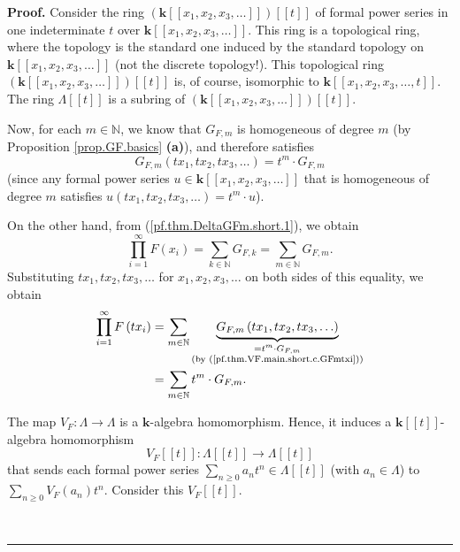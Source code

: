 \documentclass[numbers=enddot,12pt,final,onecolumn,notitlepage]{scrartcl}%
\theoremstyle{definition}
\newenvironment{proof}[1][Proof]{\noindent\textbf{#1.} }{\ \rule{0.5em}{0.5em}}
\let\sumnonlimits\sum
\let\prodnonlimits\prod
\renewcommand{\sum}{\sumnonlimits\limits}
\renewcommand{\prod}{\prodnonlimits\limits}
\newenvironment{vershort}{}{}
\begin{document}
\begin{vershort}
\begin{proof}
Consider the ring $\left(  \mathbf{k}\left[  \left[  x_{1},x_{2},x_{3}%
,\ldots\right]  \right]  \right)  \left[  \left[  t\right]  \right]  $ of
formal power series in one indeterminate $t$ over $\mathbf{k}\left[  \left[
x_{1},x_{2},x_{3},\ldots\right]  \right]  $. This ring is a topological ring,
where the topology is the standard one induced by the standard topology on
$\mathbf{k}\left[  \left[  x_{1},x_{2},x_{3},\ldots\right]  \right]  $ (not
the discrete topology!). This topological ring $\left(  \mathbf{k}\left[
\left[  x_{1},x_{2},x_{3},\ldots\right]  \right]  \right)  \left[  \left[
t\right]  \right]  $ is, of course, isomorphic to $\mathbf{k}\left[  \left[
x_{1},x_{2},x_{3},\ldots,t\right]  \right]  $. The ring $\Lambda\left[
\left[  t\right]  \right]  $ is a subring of $\left(  \mathbf{k}\left[
\left[  x_{1},x_{2},x_{3},\ldots\right]  \right]  \right)  \left[  \left[
t\right]  \right]  $.

Now, for each $m\in\mathbb{N}$, we know that $G_{F,m}$ is homogeneous of
degree $m$ (by Proposition \ref{prop.GF.basics} \textbf{(a)}), and therefore
satisfies%
\begin{equation}
G_{F,m}\left(  tx_{1},tx_{2},tx_{3},\ldots\right)  =t^{m}\cdot G_{F,m}
\label{pf.thm.VF.main.short.c.GFmtxi}%
\end{equation}
(since any formal power series $u\in\mathbf{k}\left[  \left[  x_{1}%
,x_{2},x_{3},\ldots\right]  \right]  $ that is homogeneous of degree $m$
satisfies $u\left(  tx_{1},tx_{2},tx_{3},\ldots\right)  =t^{m}\cdot u$).

On the other hand, from (\ref{pf.thm.DeltaGFm.short.1}), we obtain%
\[
\prod_{i=1}^{\infty}F\left(  x_{i}\right)  =\sum_{k\in\mathbb{N}}G_{F,k}%
=\sum_{m\in\mathbb{N}}G_{F,m}.
\]
Substituting $tx_{1},tx_{2},tx_{3},\ldots$ for $x_{1},x_{2},x_{3},\ldots$ on
both sides of this equality, we obtain%
\begin{align}
\prod_{i=1}^{\infty}F\left(  tx_{i}\right)   &  =\sum_{m\in\mathbb{N}%
}\underbrace{G_{F,m}\left(  tx_{1},tx_{2},tx_{3},\ldots\right)  }%
_{\substack{=t^{m}\cdot G_{F,m}\\\text{(by
(\ref{pf.thm.VF.main.short.c.GFmtxi}))}}}\nonumber\\
&  =\sum_{m\in\mathbb{N}}t^{m}\cdot G_{F,m}.
\label{pf.thm.VF.main.short.c.GFtxi}%
\end{align}


The map $V_{F}:\Lambda\rightarrow\Lambda$ is a $\mathbf{k}$-algebra
homomorphism. Hence, it induces a $\mathbf{k}\left[  \left[  t\right]
\right]  $-algebra homomorphism%
\[
V_{F}\left[  \left[  t\right]  \right]  :\Lambda\left[  \left[  t\right]
\right]  \rightarrow\Lambda\left[  \left[  t\right]  \right]
\]
that sends each formal power series $\sum_{n\geq0}a_{n}t^{n}\in\Lambda\left[
\left[  t\right]  \right]  $ (with $a_{n}\in\Lambda$) to $\sum_{n\geq0}%
V_{F}\left(  a_{n}\right)  t^{n}$. Consider this $V_{F}\left[  \left[
t\right]  \right]  $.


\end{proof}
\end{vershort}
\end{document}

